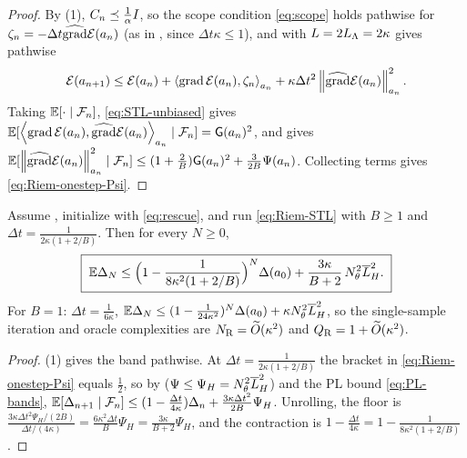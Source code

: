 \begin{proof}
By (1), $C_n\preceq\tfrac1\alpha I$, so the scope condition \eqref{eq:scope}
holds pathwise for $\zeta_n=-\Delta t\widehat{\operatorname{grad}}\mathcal{E}(a_n)$ (as in , since
$\Delta t\kappa\leq1$), and  with $L=2L_\Lambda=2\kappa$ gives pathwise
\[
    \mathcal{E}(a_{n+1})\leq\mathcal{E}(a_n)+\left\langle \operatorname{grad}\mathcal{E}(a_n),\zeta_n\right\rangle_{a_n}+\kappa\Delta t^2\left\lVert \widehat{\operatorname{grad}}\mathcal{E}(a_n)\right\rVert_{a_n}^2 .
\]
Taking $\mathbb{E}[\cdot\mid\mathcal{F}_n]$, \eqref{eq:STL-unbiased} gives
$\mathbb{E}[\left\langle \operatorname{grad}\mathcal{E}(a_n),\widehat{\operatorname{grad}}\mathcal{E}(a_n)\right\rangle_{a_n}\mid\mathcal{F}_n]=\mathsf{G}(a_n)^2$, and
 gives
$\mathbb{E}[\left\lVert \widehat{\operatorname{grad}}\mathcal{E}(a_n)\right\rVert_{a_n}^2\mid\mathcal{F}_n]\leq(1+\tfrac2B)\mathsf{G}(a_n)^2+\tfrac{3}{2B}\Psi(a_n)$.
Collecting terms gives \eqref{eq:Riem-onestep-Psi}.
\end{proof}

\begin{theorem}
\label{thm:Riem-Hlip}
Assume , initialize with \eqref{eq:rescue}, and
run \eqref{eq:Riem-STL} with $B\geq1$ and $\Delta t=\tfrac1{2\kappa(1+2/B)}$. Then for every $N\geq0$,
\begin{equation}
\label{eq:Riem-Hlip}
    \boxed{\;
    \mathbb{E}\Delta_N\leq\Bigl(1-\frac1{8\kappa^2(1+2/B)}\Bigr)^N\Delta(a_0)+\frac{3\kappa}{B+2}\,N_\theta^2\overline{L}_H^2 .
    \;}
\end{equation}
For $B=1$: $\Delta t=\tfrac1{6\kappa}$, $\mathbb{E}\Delta_N\leq(1-\tfrac1{24\kappa^2})^N\Delta(a_0)+\kappa N_\theta^2\overline{L}_H^2$,
so the single-sample iteration and oracle complexities are $N_{\mathrm{R}}=\widetilde O(\kappa^2)$ and
$Q_{\mathrm{R}}=1+\widetilde O(\kappa^2)$.
\end{theorem}

\begin{proof}
(1) gives the band pathwise. At $\Delta t=\tfrac1{2\kappa(1+2/B)}$ the bracket in
\eqref{eq:Riem-onestep-Psi} equals $\tfrac12$, so by  ($\Psi\leq\Psi_H=N_\theta^2\overline{L}_H^2$)
and the PL bound \eqref{eq:PL-bands},
$\mathbb{E}[\Delta_{n+1}\mid\mathcal{F}_n]\leq(1-\tfrac{\Delta t}{4\kappa})\Delta_n+\tfrac{3\kappa\Delta t^2}{2B}\Psi_H$.
Unrolling, the floor is $\tfrac{3\kappa\Delta t^2\Psi_H/(2B)}{\Delta t/(4\kappa)}=\tfrac{6\kappa^2\Delta t}B\Psi_H=\tfrac{3\kappa}{B+2}\Psi_H$,
and the contraction is $1-\tfrac{\Delta t}{4\kappa}=1-\tfrac1{8\kappa^2(1+2/B)}$.
\end{proof}

